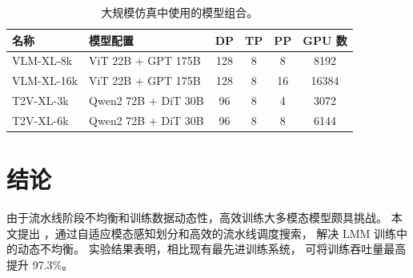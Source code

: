 \begin{table}[!t]
    \caption{
        大规模仿真中使用的模型组合。
    }
    \label{table:xl-model-setup}

    \footnotesize
    \begin{tabular}{llcccc}
    \toprule
    \textbf{名称} & \textbf{模型配置} & \textbf{DP} & \textbf{TP} & \textbf{PP} & \textbf{GPU 数} \\
    \midrule
    VLM-XL-8k & ViT 22B + GPT 175B & 128 & 8 & 8 & 8192 \\
    VLM-XL-16k & ViT 22B + GPT 175B & 128 & 8 & 16 & 16384 \\
    \midrule
    T2V-XL-3k & Qwen2 72B + DiT 30B & 96 & 8 & 4 & 3072 \\
    T2V-XL-6k & Qwen2 72B + DiT 30B & 96 & 8 & 8 & 6144 \\
    \bottomrule
    \end{tabular}
\end{table}

\section{结论}

由于流水线阶段不均衡和训练数据动态性，高效训练大多模态模型颇具挑战。
本文提出 {\sys}，通过自适应模态感知划分和高效的流水线调度搜索，
解决 LMM 训练中的动态不均衡。
实验结果表明，相比现有最先进训练系统，{\sys} 可将训练吞吐量最高提升 97.3\%。
